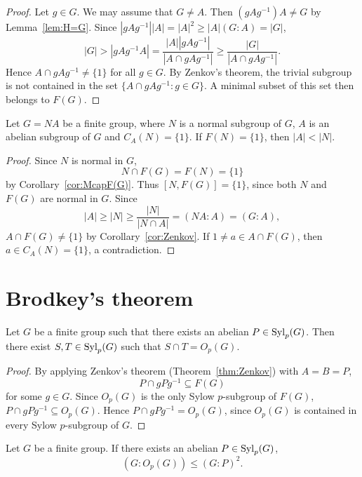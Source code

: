 \begin{proof}
	Let $g\in G$. We may assume that $G\ne A$. Then $(gAg^{-1})A\ne G$ by Lemma~\ref{lem:H=G}. Since 
	$|gAg^{-1}||A|=|A|^2\geq |A|(G:A)=|G|$, 
	\[
		|G|>|gAg^{-1}A|
		=\frac{|A||gAg^{-1}|}{|A\cap gAg^{-1}|}
		\geq \frac{|G|}{|A\cap gAg^{-1}|}.
	\]
	Hence $A\cap gAg^{-1}\ne\{1\}$ for all $g\in G$. By Zenkov's theorem, 
    the trivial subgroup is not contained in 
    the set $\{A\cap gAg^{-1}:g\in G\}$. A minimal subset 
    of this set then belongs to $F(G)$. 
\end{proof}

\begin{corollary}
	Let $G=NA$ be a finite group, where $N$ is a normal subgroup of $G$, $A$ is an abelian subgroup of $G$ and 
	$C_A(N)=\{1\}$. If $F(N)=\{1\}$, then $|A|<|N|$. 
\end{corollary}

\begin{proof}
	Since $N$ is normal in $G$, 
	\[
    N\cap F(G)=F(N)=\{1\}
    \]
    by Corollary~\ref{cor:McapF(G)}. Thus $[N,F(G)]=\{1\}$, since 
	both $N$ and $F(G)$ are normal in $G$. Since 
	\[
	|A|\geq |N|\geq \frac{|N|}{|N\cap A|}=(NA:A)=(G:A),
	\]
	$A\cap F(G)\ne\{1\}$ by Corollary~\ref{cor:Zenkov}. If $1\ne a\in
	A\cap F(G)$, then $a\in C_A(N)=\{1\}$, a contradiction. 
\end{proof}

\section{Brodkey's theorem}

\begin{theorem}[Brodkey]
	\label{thm:Brodkey}
	Let $G$ be a finite group such that there exists an abelian $P\in\mathrm{Syl}_p(G)$. Then
    there exist $S,T\in\mathrm{Syl}_p(G)$ such that $S\cap T=O_p(G)$.
\end{theorem}

\begin{proof}
	By applying Zenkov's theorem (Theorem~\ref{thm:Zenkov}) with $A=B=P$, 
	\[
    P\cap gPg^{-1}\subseteq F(G)
    \]
    for some $g\in G$. Since $O_p(G)$ is the only Sylow $p$-subgroup of 
	$F(G)$, $P\cap gPg^{-1}\subseteq O_p(G)$.
	Hence $P\cap gPg^{-1}=O_p(G)$, since $O_p(G)$ is contained in every Sylow $p$-subgroup 
	of $G$. 
\end{proof}

\begin{corollary}
	\label{corollary:GP2}
	Let $G$ be a finite group. If there exists an abelian $P\in \mathrm{Syl}_p(G)$, 
	\[
	(G:O_p(G))\leq (G:P)^2. 
	\]
\end{corollary}

